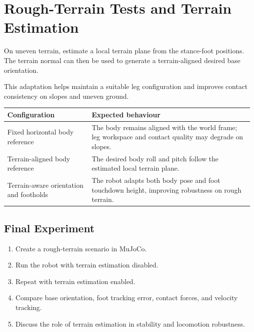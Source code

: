 \documentclass[11pt,a4paper]{article}
\begin{document}
\section{Rough-Terrain Tests and Terrain Estimation}

On uneven terrain, estimate a local terrain plane from the stance-foot positions. The terrain normal can then be used to generate a terrain-aligned desired base orientation.

This adaptation helps maintain a suitable leg configuration and improves contact consistency on slopes and uneven ground.

\begin{table}[h]
\centering
\begin{tabular}{p{}p{}}
\toprule
Configuration & Expected behaviour \\
\midrule
Fixed horizontal body reference &
The body remains aligned with the world frame; leg workspace and contact quality may degrade on slopes. \\[0.2cm]
Terrain-aligned body reference &
The desired body roll and pitch follow the estimated local terrain plane. \\[0.2cm]
Terrain-aware orientation and footholds &
The robot adapts both body pose and foot touchdown height, improving robustness on rough terrain. \\
\bottomrule
\end{tabular}
\end{table}

\subsection*{Final Experiment}

\begin{enumerate}[label=\arabic*.]
    \item Create a rough-terrain scenario in MuJoCo.
    \item Run the robot with terrain estimation disabled.
    \item Repeat with terrain estimation enabled.
    \item Compare base orientation, foot tracking error, contact forces, and velocity tracking.
    \item Discuss the role of terrain estimation in stability and locomotion robustness.
\end{enumerate}
\end{document}
